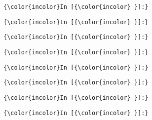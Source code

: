 \documentclass[11pt]{article}
\begin{document}
    \begin{Verbatim}[commandchars=\\\{\}]
{\color{incolor}In [{\color{incolor} }]:} 
\end{Verbatim}

    \begin{Verbatim}[commandchars=\\\{\}]
{\color{incolor}In [{\color{incolor} }]:} 
\end{Verbatim}

    \begin{Verbatim}[commandchars=\\\{\}]
{\color{incolor}In [{\color{incolor} }]:} 
\end{Verbatim}

    \begin{Verbatim}[commandchars=\\\{\}]
{\color{incolor}In [{\color{incolor} }]:} 
\end{Verbatim}

    \begin{Verbatim}[commandchars=\\\{\}]
{\color{incolor}In [{\color{incolor} }]:} 
\end{Verbatim}

    \begin{Verbatim}[commandchars=\\\{\}]
{\color{incolor}In [{\color{incolor} }]:} 
\end{Verbatim}

    \begin{Verbatim}[commandchars=\\\{\}]
{\color{incolor}In [{\color{incolor} }]:} 
\end{Verbatim}

    \begin{Verbatim}[commandchars=\\\{\}]
{\color{incolor}In [{\color{incolor} }]:} 
\end{Verbatim}


    
    
    
    
\end{document}

